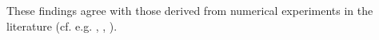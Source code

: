 %
These findings agree with
those derived from
numerical experiments in
the literature
(cf. e.g.
\cite[Sect. 5]{article:FoucartACHA2009},
\cite[Sect. 3]{proc:ChartrandICASSP2008},
\cite[Sect. III]{article:ChartrandISPL2007}%
).
